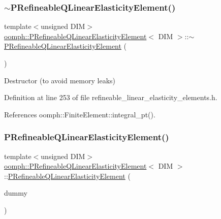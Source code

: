 \subsubsection{\texorpdfstring{$\sim$\+P\+Refineable\+Q\+Linear\+Elasticity\+Element()}{~PRefineableQLinearElasticityElement()}}
{\footnotesize\ttfamily template$<$unsigned D\+IM$>$ \\
\hyperlink{classoomph_1_1PRefineableQLinearElasticityElement}{oomph\+::\+P\+Refineable\+Q\+Linear\+Elasticity\+Element}$<$ D\+IM $>$\+::$\sim$\hyperlink{classoomph_1_1PRefineableQLinearElasticityElement}{P\+Refineable\+Q\+Linear\+Elasticity\+Element} (\begin{DoxyParamCaption}{ }\end{DoxyParamCaption})\hspace{0.3cm}{\ttfamily [inline]}}



Destructor (to avoid memory leaks) 



Definition at line 253 of file refineable\+\_\+linear\+\_\+elasticity\+\_\+elements.\+h.



References oomph\+::\+Finite\+Element\+::integral\+\_\+pt().

\mbox{\label{classoomph_1_1PRefineableQLinearElasticityElement_a794f9fea54d1f53b15293ba460de7a7a}} 
\subsubsection{\texorpdfstring{P\+Refineable\+Q\+Linear\+Elasticity\+Element()}{PRefineableQLinearElasticityElement()}\hspace{0.1cm}{\footnotesize\ttfamily [2/2]}}
{\footnotesize\ttfamily template$<$unsigned D\+IM$>$ \\
\hyperlink{classoomph_1_1PRefineableQLinearElasticityElement}{oomph\+::\+P\+Refineable\+Q\+Linear\+Elasticity\+Element}$<$ D\+IM $>$\+::\hyperlink{classoomph_1_1PRefineableQLinearElasticityElement}{P\+Refineable\+Q\+Linear\+Elasticity\+Element} (\begin{DoxyParamCaption}\item[{const \hyperlink{classoomph_1_1PRefineableQLinearElasticityElement}{P\+Refineable\+Q\+Linear\+Elasticity\+Element}$<$ D\+IM $>$ \&}]{dummy }\end{DoxyParamCaption})\hspace{0.3cm}{\ttfamily [inline]}}



